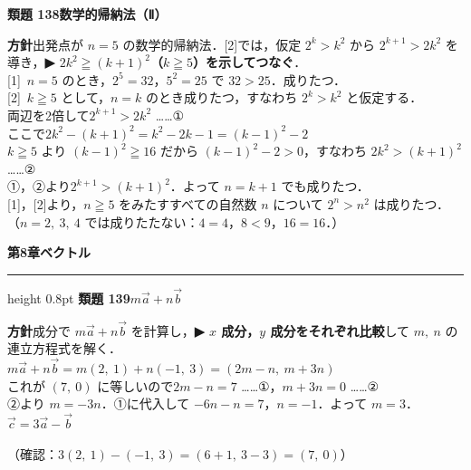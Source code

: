 \documentclass[a4paper,11pt]{ltjsarticle}
\newcommand{\ans}[2]{\Needspace{5\baselineskip}\vspace{6pt}%
  {\sffamily\bfseries 類題 #1\quad #2}\par}
\newcommand{\point}[1]{\textsf{\bfseries ▶ #1}}
\newcommand{\shouans}[2]{\Needspace{8\baselineskip}\vspace{10pt}\markboth{解答\quad #1\quad #2}{}%
  {\sffamily\bfseries\Large #1\quad #2\par}\vspace{2pt}\hrule height 0.8pt\vspace{2pt}}
\begin{document}
\ans{138}{数学的帰納法（Ⅱ）}
\begin{kai}
\textbf{方針}\quad 出発点が $n=5$ の数学的帰納法．[2]では，仮定 $2^k>k^2$ から $2^{k+1}>2k^2$ を導き，\point{$2k^2\geqq(k+1)^2$（$k\geqq5$）を示してつなぐ}．\\[2pt]
{[1]}\ $n=5$ のとき，$2^5=32$，$5^2=25$ で $32>25$．成りたつ．\\[2pt]
{[2]}\ $k\geqq5$ として，$n=k$ のとき成りたつ，すなわち $2^k>k^2$ と仮定する．\\
\hspace*{1.5em}両辺を2倍して\quad $2^{k+1}>2k^2$ ……①\\
\hspace*{1.5em}ここで\quad $2k^2-(k+1)^2=k^2-2k-1=(k-1)^2-2$\\
\hspace*{1.5em}$k\geqq5$ より $(k-1)^2\geqq16$ だから $(k-1)^2-2>0$，すなわち $2k^2>(k+1)^2$ ……②\\
\hspace*{1.5em}①，②より\quad $2^{k+1}>(k+1)^2$．よって $n=k+1$ でも成りたつ．\\[2pt]
{[1]}，[2]より，$n\geqq5$ をみたすすべての自然数 $n$ について $2^n>n^2$ は成りたつ．\\
（$n=2,\ 3,\ 4$ では成りたたない：$4=4$，$8<9$，$16=16$．）
\end{kai}

\shouans{第8章}{ベクトル}
\ans{139}{$m\vec a+n\vec b$}
\begin{kai}
\textbf{方針}\quad 成分で $m\vec a+n\vec b$ を計算し，\point{$x$ 成分，$y$ 成分をそれぞれ比較}して $m,\ n$ の連立方程式を解く．\\[2pt]
$m\vec a+n\vec b=m(2,\ 1)+n(-1,\ 3)=(2m-n,\ m+3n)$\\
これが $(7,\ 0)$ に等しいので\quad $2m-n=7$ ……①，\quad $m+3n=0$ ……②\\
②より $m=-3n$．①に代入して $-6n-n=7$，$n=-1$．よって $m=3$．\\[2pt]
$\vec c=3\vec a-\vec b$\\
\begin{center}
\end{center}
（確認：$3(2,\ 1)-(-1,\ 3)=(6+1,\ 3-3)=(7,\ 0)$）
\end{kai}
\end{document}
